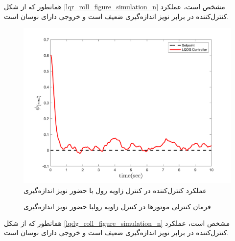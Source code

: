 همانطور که از شکل
\ref{lqr_roll_figure_simulation_n}
مشخص است، عملکرد کنترل‌کننده  در برابر نویز اندازه‌گیری ضعیف است و خروجی دارای نوسان است.



\begin{figure}[H]
	\includegraphics[width=.48\linewidth]{../Figures/MIL/LQDG/Roll/lqdg_roll.png}
	\centering
	\caption{عملكرد کنترل‌کننده   در کنترل زاويه رول با حضور نويز اندازه‌گیری}
	\label{lqdg_roll_fig_simulation_n}
\end{figure}
\begin{figure}[H]
	\centering
	\caption{‫‪فرمان کنترلی موتورها در کنترل زاویه رولبا حضور نويز اندازه‌گیری}
\end{figure}
همانطور که از شکل
\ref{lqdg_roll_figure_simulation_n}
مشخص است، عملکرد کنترل‌کننده  در برابر نویز اندازه‌گیری ضعیف است و خروجی دارای نوسان است.





